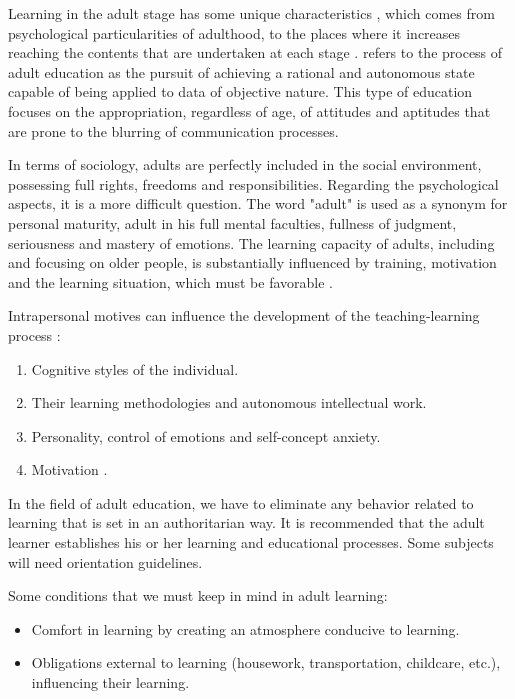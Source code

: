 \documentclass[english]{textolivre}
\begin{document}
Learning in the adult stage has some unique characteristics \cite{anaya_exito_2014}, which comes from psychological particularities of adulthood, to the places where it increases reaching the contents that are undertaken at each stage \cite{vergel-ortega_factores_2016}. \textcite{unesco_educacion_2005} refers to the process of adult education as the pursuit of achieving a rational and autonomous state capable of being applied to data of objective nature. This type of education focuses on the appropriation, regardless of age, of attitudes and aptitudes that are prone to the blurring of communication processes.

In terms of sociology, adults are perfectly included in the social environment, possessing full rights, freedoms and responsibilities. Regarding the psychological aspects, it is a more difficult question. The word "adult" is used as a synonym for personal maturity, adult in his full mental faculties, fullness of judgment, seriousness and mastery of emotions. The learning capacity of adults, including and focusing on older people, is substantially influenced by training, motivation and the learning situation, which must be favorable \cite{cuenca_motivacion_2011}.
	
Intrapersonal motives can influence the development of the teaching-learning process \cite{cadena_narvaez_incidencia_2016,jimenez_climent_inteligencias_2017}:

\begin{enumerate}
    \item Cognitive styles of the individual.
    \item Their learning methodologies and autonomous intellectual work.
    \item Personality, control of emotions and self-concept anxiety.
    \item Motivation \cite{martinez_lopez_salud_2003,fernandez_palacio_neurodidactica_2017}.
\end{enumerate}

In the field of adult education, we have to eliminate any behavior related to learning that is set in an authoritarian way. It is recommended that the adult learner establishes his or her learning and educational processes. Some subjects will need orientation guidelines.

Some conditions that we must keep in mind in adult learning:

\begin{itemize}
    \item Comfort in learning by creating an atmosphere conducive to learning.
    \item Obligations external to learning (housework, transportation, childcare, etc.), influencing their learning.
\end{itemize}
\end{document}
